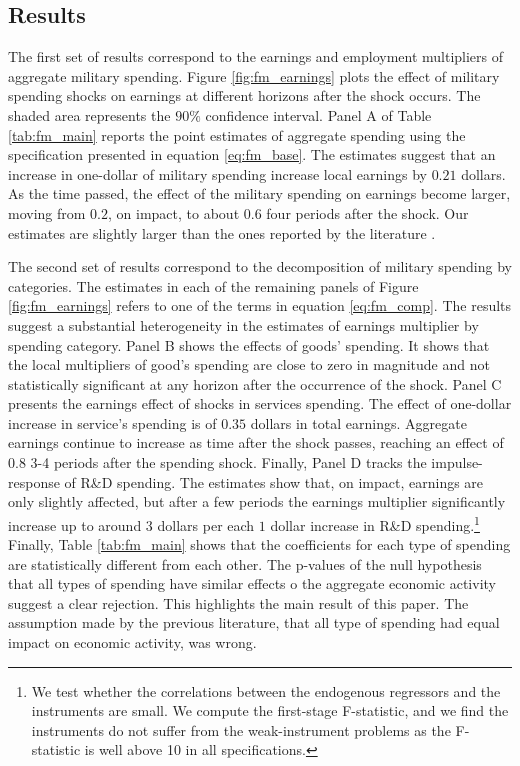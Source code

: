 \documentclass[dv_diss_main.tex]{subfiles}
\begin{document}
\subsection{Results}

The first set of results correspond to the earnings and employment multipliers of aggregate military spending. Figure \ref{fig:fm_earnings} plots the  effect of military spending shocks on earnings at different horizons after the shock occurs. The shaded area represents the $90\%$ confidence interval. Panel A of Table \ref{tab:fm_main} reports the point estimates of aggregate spending using the specification presented in equation \eqref{eq:fm_base}. The estimates suggest that an increase in one-dollar of military spending increase local earnings by $0.21$ dollars. As the time passed, the effect of the military spending on earnings become larger, moving from $0.2$, on impact, to about $0.6$ four periods after the shock. Our estimates are slightly larger than the ones reported by the literature \citep{suarez2016estimating, Auerbach2019,Demyanyk2019}.

The second set of results correspond to the decomposition of military spending by categories. The estimates in each of the remaining panels of Figure \ref{fig:fm_earnings} refers to one of the terms in equation \eqref{eq:fm_comp}. The results suggest a substantial heterogeneity in the estimates of earnings multiplier by spending category. Panel B shows the effects of goods' spending. It shows that the local multipliers of good's spending are close to zero in magnitude and not statistically significant at any horizon after the occurrence of the shock. Panel C presents the earnings effect of shocks in services spending. The effect of one-dollar increase in service's spending is of $0.35$ dollars in total earnings. Aggregate earnings continue to increase as time after the shock passes, reaching an effect of $0.8$ 3-4 periods after the spending shock. Finally, Panel D tracks the impulse-response of R\&D spending. The estimates show that, on impact, earnings are only slightly affected, but after a few periods the earnings multiplier significantly increase up to around $3$ dollars per each $1$ dollar increase in R\&D spending.\footnote{We test whether the correlations between the endogenous regressors and the instruments are small. We compute the first-stage F-statistic, and we find the instruments do not suffer from the weak-instrument problems as the F-statistic is well above 10 in all specifications.} Finally, Table \ref{tab:fm_main} shows that the coefficients for each type of spending are statistically different from each other. The p-values of the null hypothesis that all types of spending have similar effects o the aggregate economic activity suggest a clear rejection. This highlights the main result of this paper. The assumption made by the previous literature, that all type of spending had equal impact on economic activity, was wrong. 
\end{document}
